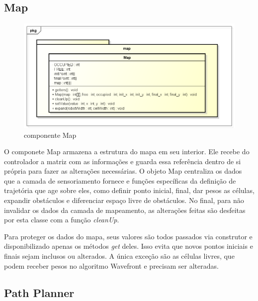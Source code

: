 \subsection{Map}

\begin{figure}[h]
	\centering
	\label{fig24}
		\includegraphics[keepaspectratio=true,scale=0.5]{figuras/pkgmap.png}
	\caption{componente Map}
\end{figure}

O componete Map armazena a estrutura do mapa em seu interior. Ele recebe do controlador a matriz com as informações e guarda essa referência dentro de si própria para fazer as alterações necessárias. O objeto Map centraliza os dados que a camada de sensoriamento fornece e funções específicas da definição de trajetória que age sobre eles, como definir ponto inicial, final, dar pesos as células, expandir obstáculos e diferenciar espaço livre de obstáculos. No final, para não invalidar os dados da camada de mapeamento, as alterações feitas são desfeitas por esta classe com a função \textit{cleanUp}.

Para proteger os dados do mapa, seus valores são todos passados via construtor e disponibilizado apenas os métodos \textit{get} deles. Isso evita que novos pontos iniciais e finais sejam inclusos ou alterados. A única exceção são as células livres, que podem receber pesos no algoritmo Wavefront e precisam ser alteradas.

\subsection{Path Planner}

